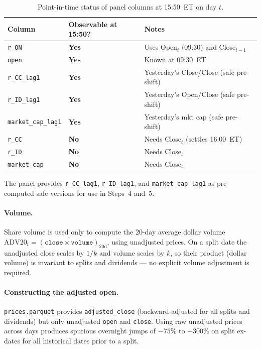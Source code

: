 \documentclass[12pt,a4paper]{article}
\begin{document}
\begin{table}[H]
\centering\small
\caption{Point-in-time status of panel columns at 15:50~ET on day $t$.}
\label{tab:pit}
\begin{tabular}{llp{5.5cm}}
\toprule
Column & Observable at 15:50? & Notes \\
\midrule
\texttt{r\_ON} & \textbf{Yes} & Uses Open$_t$ (09:30) and Close$_{t-1}$ \\
\texttt{open}  & \textbf{Yes} & Known at 09:30~ET \\
\texttt{r\_CC\_lag1} & \textbf{Yes} & Yesterday's Close/Close (safe pre-shift) \\
\texttt{r\_ID\_lag1} & \textbf{Yes} & Yesterday's Open/Close (safe pre-shift) \\
\texttt{market\_cap\_lag1} & \textbf{Yes} & Yesterday's mkt cap (safe pre-shift) \\
\midrule
\texttt{r\_CC} & \textbf{No} & Needs Close$_t$ (settles 16:00~ET) \\
\texttt{r\_ID} & \textbf{No} & Needs Close$_t$ \\
\texttt{market\_cap} & \textbf{No} & Needs Close$_t$ \\
\bottomrule
\end{tabular}
\end{table}

\noindent The panel provides \texttt{r\_CC\_lag1}, \texttt{r\_ID\_lag1}, and
\texttt{market\_cap\_lag1} as pre-computed safe versions for use in Steps~4 and~5.

\paragraph{Volume.}
Share volume is used only to compute the 20-day average dollar volume
$\text{ADV20}_t = \overline{(\texttt{close} \times \texttt{volume})}_{20\text{d}}$,
using unadjusted prices.  On a split date the unadjusted close scales by
$1/k$ and volume scales by $k$, so their product (dollar volume) is invariant
to splits and dividends --- no explicit volume adjustment is required.

\paragraph{Constructing the adjusted open.}
\texttt{prices.parquet} provides \texttt{adjusted\_close} (backward-adjusted for
all splits and dividends) but only unadjusted \texttt{open} and \texttt{close}.
Using raw unadjusted prices across days produces spurious overnight jumps of
$-75\%$ to $+300\%$ on split ex-dates for all historical dates prior to a split.
\end{document}

